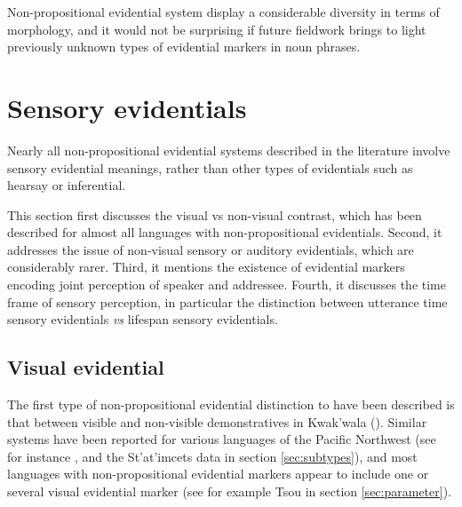 \documentclass[oneside,a4paper,11pt]{article}
\begin{document}
 

Non-propositional evidential system display a considerable diversity in terms of morphology, and it would not be surprising if future fieldwork brings to light previously unknown types of evidential markers in noun phrases.

\section{Sensory evidentials} \label{sec:sensory}
Nearly all non-propositional evidential systems described in the literature involve sensory evidential meanings, rather than other types of evidentials such as hearsay or inferential. 

This section first discusses the visual vs non-visual contrast, which has been described for almost all languages with non-propositional evidentials. Second, it addresses the issue of non-visual sensory or auditory evidentials, which are considerably rarer.  Third, it mentions the existence of evidential markers encoding joint perception of speaker and addressee. Fourth, it discusses the time frame of sensory perception, in particular the distinction between utterance time sensory evidentials \textit{vs} lifespan sensory evidentials.

\subsection{Visual evidential} \label{sec:visible}
The first type of non-propositional evidential distinction to have been described  is that between visible and non-visible demonstratives in Kwak'wala (\citealt[527-531]{boas11kwakiutl}). Similar systems have been reported for various languages of the Pacific Northwest (see for instance \citealt{bach06deixis.wakashan}, and the St'at'imcets data in section \ref{sec:subtypes}), and most languages with non-propositional evidential markers appear to include one or several visual evidential marker (see for example Tsou in section \ref{sec:parameter}).  


 
\end{document}
